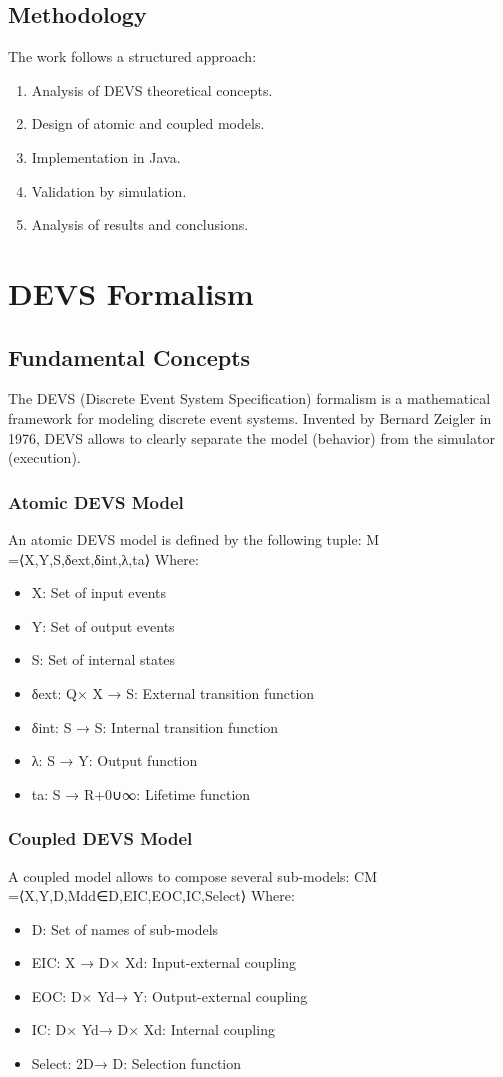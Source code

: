 \documentclass{article}
\begin{document}
\subsection{Methodology}
The work follows a structured approach:
\begin{enumerate}
    \item Analysis of DEVS theoretical concepts.
    \item Design of atomic and coupled models.
    \item Implementation in Java.
    \item Validation by simulation.
    \item Analysis of results and conclusions.
\end{enumerate}

\section{DEVS Formalism}
\subsection{Fundamental Concepts}
The DEVS (Discrete Event System Specification) formalism is a mathematical framework for modeling discrete event systems. Invented by Bernard Zeigler in 1976, DEVS allows to clearly separate the model (behavior) from the simulator (execution).

\subsubsection{Atomic DEVS Model}
An atomic DEVS model is defined by the following tuple:
M =⟨X,Y,S,δext,δint,λ,ta⟩
Where:
\begin{itemize}
    \item X: Set of input events
    \item Y: Set of output events
    \item S: Set of internal states
    \item δext: Q× X → S: External transition function
    \item δint: S → S: Internal transition function
    \item λ: S → Y: Output function
    \item ta: S → R+0∪{∞}: Lifetime function
\end{itemize}

\subsubsection{Coupled DEVS Model}
A coupled model allows to compose several sub-models:
CM =⟨X,Y,D,{Md}d∈D,EIC,EOC,IC,Select⟩
Where:
\begin{itemize}
    \item D: Set of names of sub-models
    \item EIC: X → D× Xd: Input-external coupling
    \item EOC: D× Yd→ Y: Output-external coupling
    \item IC: D× Yd→ D× Xd: Internal coupling
    \item Select: 2D→ D: Selection function
\end{itemize}
\end{document}

